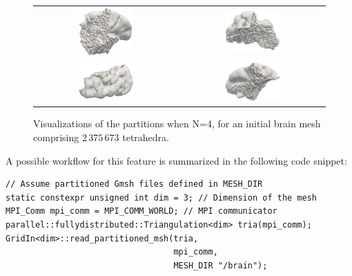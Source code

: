 \documentclass[a4paper,12pt]{article}
\begin{document}
\begin{figure}[htbp]
    \centering
    \begin{tabular}{cc}
        \includegraphics[width=0.4\textwidth]{brain_1_cropped.pdf} &
        \includegraphics[width=0.4\textwidth]{brain_2_cropped.pdf}   \\
        \includegraphics[width=0.4\textwidth]{brain_3_cropped.pdf} &
        \includegraphics[width=0.4\textwidth]{brain_4_cropped.pdf}   \\
    \end{tabular}
    \caption{Visualizations of the partitions when N=4, for an initial brain mesh comprising $2\,375\,673$ tetrahedra.}
    \label{fig:partitioned_meshes}
\end{figure}

\noindent A possible workflow for this feature is summarized in the following code snippet:
\begin{lstlisting}[caption=Creating a \texttt{p::f::T} object from partitioned Gmsh files]
// Assume partitioned Gmsh files defined in MESH_DIR
static constexpr unsigned int dim = 3; // Dimension of the mesh
MPI_Comm mpi_comm = MPI_COMM_WORLD; // MPI communicator
parallel::fullydistributed::Triangulation<dim> tria(mpi_comm);
GridIn<dim>::read_partitioned_msh(tria,
                                  mpi_comm,
                                  MESH_DIR "/brain");
\end{lstlisting}
\end{document}
